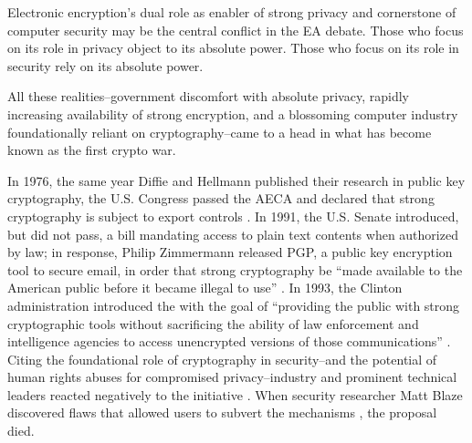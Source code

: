 


Electronic encryption's dual role as enabler of strong privacy and cornerstone of computer security may be the central
conflict in the EA debate. Those who focus on its role in privacy object to its absolute power. Those who focus on its
role in security rely on its absolute power.


All these realities--government discomfort with absolute privacy, rapidly increasing availability of strong encryption,
and a blossoming computer industry foundationally reliant on cryptography--came to a head in what has become known as
the first crypto war.

In 1976, the same year Diffie and Hellmann published their research in public key cryptography, the U.S. Congress passed
the \ac{AECA} and declared that strong cryptography is subject to export controls \cite{kehl_right_2015}. In 1991, the
U.S. Senate introduced, but did not pass, a bill mandating access to plain text contents when authorized by law; in
response, Philip Zimmermann released \ac{PGP}, a public key encryption tool to secure email, in order that strong
cryptography be ``made available to the American public before it became illegal to use'' \cite{zimmermann_1996}. In
1993, the Clinton administration introduced the  \cite{press_1993} with the goal of ``providing the
public with strong cryptographic tools without sacrificing the ability of law enforcement and intelligence agencies to
access unencrypted versions of those communications'' \cite{thompson_2015}. Citing the foundational role of cryptography
in security--and the potential of human rights abuses for compromised privacy--industry and prominent technical leaders
reacted negatively to the initiative \cite{kehl_right_2015} \cite{zimmermann_1996}. When security researcher Matt Blaze
discovered flaws that allowed users to subvert the  mechanisms \cite{blaze_protocol_1994}, the
proposal died.

